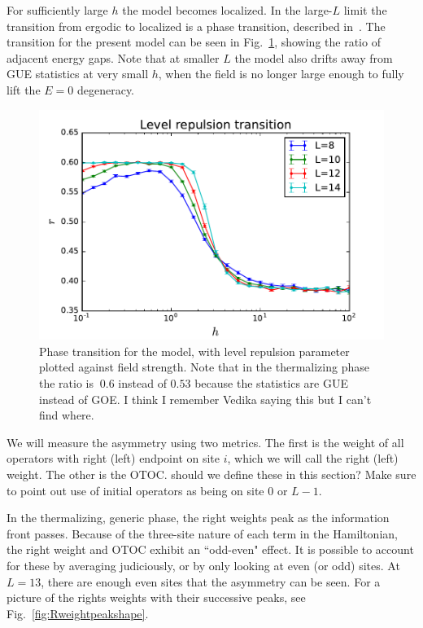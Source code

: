 \documentclass[aps,prl,reprint,superscriptaddress, longbibliography]{revtex4-1}
\newcommand{\charlie}[1]{ {\color{Magenta} {{#1}}}}
\begin{document}
For sufficiently large $h$ the model becomes localized. In the large-$L$ limit the transition from ergodic to localized is a phase transition, described in~\cite{1010.1992v1}. The transition for the present model can be seen in Fig.~\ref{fig:levelrepultrans}, showing the ratio of adjacent energy gaps. Note that at smaller $L$ the model also drifts away from GUE statistics at very small $h$, when the field is no longer large enough to fully lift the $E=0$ degeneracy.

\begin{figure}
	\includegraphics[width=\columnwidth]{levelrepultrans}
	\caption{Phase transition for the model, with level repulsion parameter plotted against field strength. Note that in the thermalizing phase the ratio is $~0.6$ instead of $0.53$ because the statistics are GUE instead of GOE. \charlie{I think I remember Vedika saying this but I can't find where.}}
	\label{fig:levelrepultrans}
\end{figure}

We will measure the asymmetry using two metrics. The first is the weight of all operators with right (left) endpoint on site $i$, which we will call the right (left) weight. The other is the OTOC. \charlie{should we define these in this section?} \charlie{Make sure to point out use of initial operators as being on site 0 or $L-1$}.

In the thermalizing, generic phase, the right weights peak as the information front passes. Because of the three-site nature of each term in the Hamiltonian, the right weight and OTOC exhibit an ``odd-even" effect. It is possible to account for these by averaging judiciously, or by only looking at even (or odd) sites. At $L=13$, there are enough even sites that the asymmetry can be seen. For a picture of the rights weights with their successive peaks, see Fig.~\ref{fig:Rweightpeakshape}. 
\end{document}
